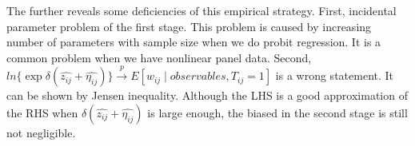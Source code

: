 \documentclass{article}
\begin{document}
The further reveals some deficiencies of this empirical strategy. First, incidental parameter problem of the first stage. This problem is caused by increasing number of parameters with sample size when we do probit regression. It is a common problem when we have nonlinear panel data. Second, $ln\{\exp{{\delta(\hat{z_{ij}}+\hat{\eta_{ij}})}}\} \xrightarrow{p}E[w_{ij} \mid observables, T_{ij} = 1]$ is a wrong statement. It can be shown by Jensen inequality. Although the LHS is a good approximation of the RHS when  $\delta(\hat{z_{ij}}+\hat{\eta_{ij}})$ is large enough, the biased in the second stage is still not negligible. 
\end{document}
